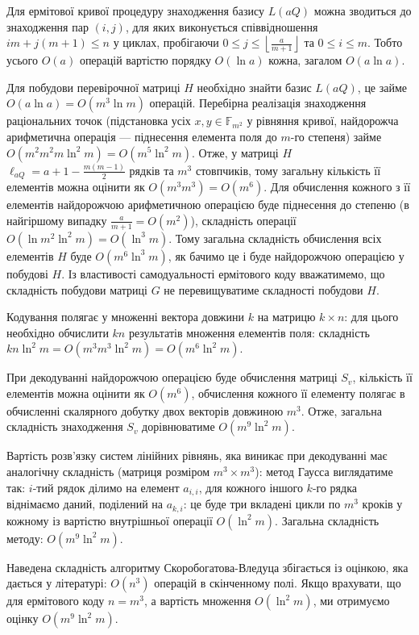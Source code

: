 \documentclass[a4paper,12pt,oneside]{article}
\begin{document}
Для ермітової кривої процедуру знаходження базису $L(aQ)$ можна зводиться до знаходження пар $(i, j)$, для яких виконується співвідношення 
$i m + j (m + 1) \le n$ у циклах, пробігаючи $0 \le j \le \left \lfloor \frac{a}{m+1} \right \rfloor$ та $0 \le i \le m$. Тобто усього $O(a)$ операцій 
вартістю порядку $O(\ln a)$ кожна, загалом $O(a \ln a)$.

Для побудови перевірочної матриці $H$ необхідно знайти базис $L(aQ)$, це займе $O(a \ln a) = O(m^3 \ln m)$ операцій. 
Перебірна реалізація знаходження раціональних точок (підстановка усіх $x, y \in \mathbb{F}_{m^2}$ у рівняння кривої, найдорожча арифметична операція --- 
піднесення елемента поля до $m$-го степеня) займе $O(m^2 m^2 m \ln^2 m) = O(m^5 \ln^2 m)$. Отже, у матриці $H$ $\ell_{aQ}=a+1-\frac{m(m-1)}{2}$ рядків та 
$m^3$ стовпчиків, тому загальну кількість її елементів можна оцінити як $O(m^3 m^3) = O(m^6)$. Для обчислення кожного з її елементів найдорожчою 
арифметичною операцією буде піднесення до степеню (в найгіршому випадку $\frac{a}{m+1}=O(m^2)$), складність операції $O(\ln m^2 \ln^2 m) = O(\ln^3 m)$. 
Тому загальна складність обчислення всіх елементів $H$ буде $O(m^6 \ln^3 m)$, як бачимо це і буде найдорожчою операцією у побудові $H$. Із 
властивості самодуальності ермітового коду вважатимемо, що складність побудови матриці $G$ не перевищуватиме складності побудови $H$.

Кодування полягає у множенні вектора довжини $k$ на матрицю $k \times n$: для цього необхідно обчислити $k n$ результатів множення елементів поля: 
складність $k n \ln^2 m = O(m^3 m^3 \ln^2 m) = O(m^6 \ln^2 m)$.

При декодуванні найдорожчою операцією буде обчислення матриці $S_v$, кількість її елементів можна оцінити як $O(m^6)$, обчислення кожного її елементу полягає 
в обчисленні скалярного добутку двох векторів довжиною $m^3$. Отже, загальна складність знаходження $S_v$ дорівнюватиме $O(m^9 \ln^2 m)$.

Вартість розв'язку систем лінійних рівнянь, яка виникає при декодуванні має аналогічну складність (матриця розміром $m^3 \times m^3$): 
метод Гаусса виглядатиме так: $i$-тий рядок ділимо на елемент $a_{i,i}$, для кожного іншого $k$-го рядка віднімаємо даний, поділений на $a_{k,i}$:
це буде три вкладені цикли по $m^3$ кроків у кожному із вартістю внутрішньої операції $O(\ln^2 m)$. Загальна складність методу: $O(m^9 \ln^2 m)$.

Наведена складність алгоритму Скоробогатова-Вледуца збігається із оцінкою, яка дається у літературі: $O(n^3)$ операцій в скінченному полі. 
Якщо врахувати, що для ермітового коду $n=m^3$, а вартість множення $O(\ln^2 m)$, ми отримуємо оцінку $O(m^9 \ln^2 m)$.
\end{document}

